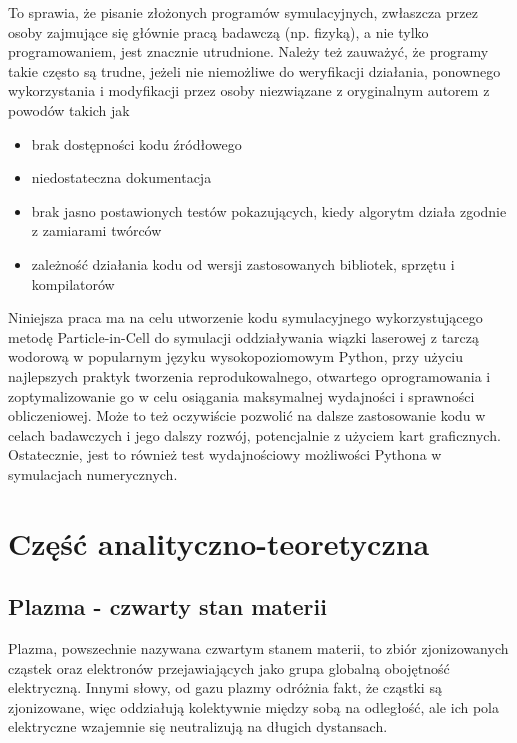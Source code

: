     To sprawia, że pisanie złożonych programów symulacyjnych, zwłaszcza przez osoby
    zajmujące się głównie pracą badawczą (np. fizyką), a nie tylko programowaniem,
    jest znacznie utrudnione. Należy też zauważyć, że programy takie często są
    trudne, jeżeli nie niemożliwe do weryfikacji działania, ponownego wykorzystania
    i modyfikacji przez osoby niezwiązane z oryginalnym autorem z powodów takich jak
    \begin{itemize}
        \item brak dostępności kodu źródłowego
        \item niedostateczna dokumentacja
        \item brak jasno postawionych testów pokazujących, kiedy algorytm działa zgodnie z zamiarami twórców
        \item zależność działania kodu od wersji zastosowanych bibliotek, sprzętu i kompilatorów
    \end{itemize}

    Niniejsza praca ma na celu utworzenie kodu symulacyjnego wykorzystującego metodę Particle-in-Cell
    do symulacji oddziaływania wiązki laserowej z tarczą wodorową w popularnym języku
    wysokopoziomowym Python, przy użyciu najlepszych praktyk tworzenia reprodukowalnego, otwartego oprogramowania
    i zoptymalizowanie go w celu osiągania maksymalnej wydajności i sprawności obliczeniowej. Może to też oczywiście
    pozwolić na dalsze
    zastosowanie kodu w celach badawczych i jego dalszy rozwój, potencjalnie z użyciem kart graficznych.
    Ostatecznie, jest to również test wydajnościowy możliwości Pythona w symulacjach %
    numerycznych.

    \section[Część analityczno-teoretyczna]{Część analityczno-teoretyczna} %

    \subsection{Plazma - czwarty stan materii}

    Plazma, powszechnie nazywana czwartym stanem materii, to zbiór zjonizowanych %
    cząstek oraz elektronów przejawiających jako grupa globalną obojętność elektryczną. Innymi słowy, od gazu plazmy
    odróżnia fakt, że cząstki są zjonizowane, więc oddziałują kolektywnie między sobą na odległość,
    ale ich pola elektryczne wzajemnie się neutralizują na długich dystansach.

